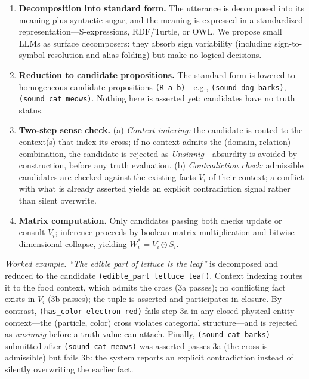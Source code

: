 \documentclass{article}
\providecommand{\tightlist}{%
  \setlength{\itemsep}{0pt}\setlength{\parskip}{0pt}}
\begin{document}
\begin{enumerate}
\def\labelenumi{\arabic{enumi}.}
\tightlist
\item
  \textbf{Decomposition into standard form.} The utterance is decomposed
  into its meaning plus syntactic sugar, and the meaning is expressed in
  a standardized representation---S-expressions, RDF/Turtle, or OWL. We
  propose small LLMs as surface decomposers: they absorb sign
  variability (including sign-to-symbol resolution and alias folding)
  but make no logical decisions.
\item
  \textbf{Reduction to candidate propositions.} The standard form is
  lowered to homogeneous candidate propositions
  \texttt{(R\ a\ b)}---e.g., \texttt{(sound\ dog\ barks)},
  \texttt{(sound\ cat\ meows)}. Nothing here is asserted yet; candidates
  have no truth status.
\item
  \textbf{Two-step sense check.} (a) \emph{Context indexing:} the
  candidate is routed to the context(s) that index its cross; if no
  context admits the (domain, relation) combination, the candidate is
  rejected as \emph{Unsinnig}---absurdity is avoided by construction,
  before any truth evaluation. (b) \emph{Contradiction check:}
  admissible candidates are checked against the existing facts \(V_i\)
  of their context; a conflict with what is already asserted yields an
  explicit contradiction signal rather than silent overwrite.
\item
  \textbf{Matrix computation.} Only candidates passing both checks
  update or consult \(V_i\); inference proceeds by boolean matrix
  multiplication and bitwise dimensional collapse, yielding
  \(W_i^{*} = V_i \odot S_i\).
\end{enumerate}

\emph{Worked example.} \emph{``The edible part of lettuce is the leaf''}
is decomposed and reduced to the candidate
\texttt{(edible\_part\ lettuce\ leaf)}. Context indexing routes it to
the food context, which admits the cross (3a passes); no conflicting
fact exists in \(V_i\) (3b passes); the tuple is asserted and
participates in closure. By contrast,
\texttt{(has\_color\ electron\ red)} fails step 3a in any closed
physical-entity context---the (particle, color) cross violates
categorial structure---and is rejected as \emph{unsinnig} before a truth
value can attach. Finally, \texttt{(sound\ cat\ barks)} submitted after
\texttt{(sound\ cat\ meows)} was asserted passes 3a (the cross is
admissible) but fails 3b: the system reports an explicit contradiction
instead of silently overwriting the earlier fact.
\end{document}
